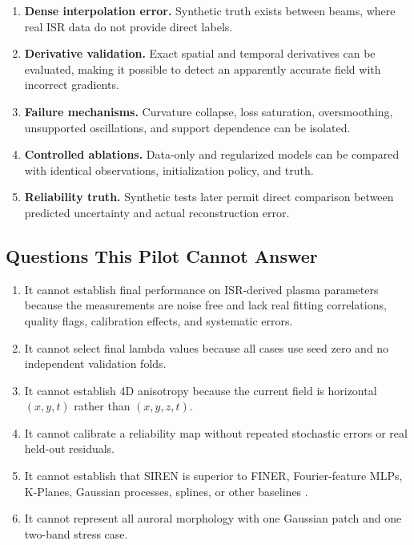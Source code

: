 \documentclass[11pt]{article}
\begin{document}
\begin{enumerate}
  \item \textbf{Dense interpolation error.} Synthetic truth exists between beams, where real ISR data do not
  provide direct labels.
  \item \textbf{Derivative validation.} Exact spatial and temporal derivatives can be evaluated, making it
  possible to detect an apparently accurate field with incorrect gradients.
  \item \textbf{Failure mechanisms.} Curvature collapse, loss saturation, oversmoothing, unsupported
  oscillations, and support dependence can be isolated.
  \item \textbf{Controlled ablations.} Data-only and regularized models can be compared with identical
  observations, initialization policy, and truth.
  \item \textbf{Reliability truth.} Synthetic tests later permit direct comparison between predicted
  uncertainty and actual reconstruction error.
\end{enumerate}

\subsection{Questions This Pilot Cannot Answer}

\begin{enumerate}
  \item It cannot establish final performance on ISR-derived plasma parameters because the measurements are
  noise free and lack real fitting correlations, quality flags, calibration effects, and systematic errors.
  \item It cannot select final lambda values because all cases use seed zero and no independent validation
  folds.
  \item It cannot establish 4D anisotropy because the current field is horizontal $(x,y,t)$ rather than
  $(x,y,z,t)$.
  \item It cannot calibrate a reliability map without repeated stochastic errors or real held-out residuals.
  \item It cannot establish that SIREN is superior to FINER, Fourier-feature MLPs, K-Planes, Gaussian
  processes, splines, or other baselines \cite{Tancik2020Fourier,Liu2023FINER,FridovichKeil2023KPlanes}.
  \item It cannot represent all auroral morphology with one Gaussian patch and one two-band stress case.
\end{enumerate}
\end{document}

